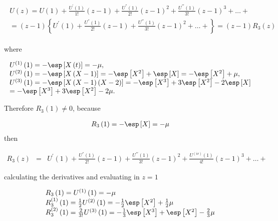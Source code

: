 \begin{eqnarray*}
\begin{array}{l}
U\left(z\right)=U\left(1\right)+\frac{U^{'}\left(1\right)}{1!}\left(z-1\right)+\frac{U^{''}\left(1\right)}{2!}\left(z-1\right)^{2}+\frac{U^{'''}\left(1\right)}{3!}\left(z-1\right)^{3}+\ldots+\\
=\left(z-1\right)\left\{U^{'}\left(1\right)+\frac{U^{''}\left(1\right)}{2!}\left(z-1\right)+\frac{U^{'''}\left(1\right)}{3!}\left(z-1\right)^{2}+\ldots+\right\}
=\left(z-1\right)R_{3}\left(z\right)
\end{array}
\end{eqnarray*}

where

\begin{eqnarray*}
\begin{array}{l}
U^{(1)}\left(1\right)=-\esp\left[X\left(t\right)\right]=-\mu,\\ U^{(2)}\left(1\right)=-\esp\left[X\left(X-1\right)\right]
=-\esp\left[X^{2}\right]+\esp\left[X\right]=-\esp\left[X^{2}\right]+\mu,\\
U^{(3)}\left(1\right)=-\esp\left[X\left(X-1\right)\left(X-2\right)\right]
=-\esp\left[X^{3}\right]+3\esp\left[X^{2}\right]-2\esp\left[X\right]\\
=-\esp\left[X^{3}\right]+3\esp\left[X^{2}\right]-2\mu.
\end{array}
\end{eqnarray*}

Therefore $R_{3}\left(1\right)\neq0$, because

\begin{eqnarray}\label{Eq.R3}
R_{3}\left(1\right)=-\esp\left[X\right]=-\mu
\end{eqnarray}
then

\begin{eqnarray}
R_{3}\left(z\right)&=&U^{'}\left(1\right)+\frac{U^{''}\left(1\right)}{2!}\left(z-1\right)+\frac{U^{'''}\left(1\right)}{3!}\left(z-1\right)^{2}+\frac{U^{(iv)}\left(1\right)}{4!}\left(z-1\right)^{3}+\ldots+
\end{eqnarray}

calculating the derivatives and evaluating in $z=1$

\begin{eqnarray}
\begin{array}{l}
R_{3}\left(1\right)=U^{(1)}\left(1\right)=-\mu\\
R_{3}^{(1)}\left(1\right)=\frac{1}{2}U^{(2)}\left(1\right)=-\frac{1}{2}\esp\left[X^{2}\right]+\frac{1}{2}\mu\\
R_{3}^{(2)}\left(1\right)=\frac{2}{3!}U^{(3)}\left(1\right)
=-\frac{1}{3}\esp\left[X^{3}\right]+\esp\left[X^{2}\right]-\frac{2}{3}\mu
\end{array}
\end{eqnarray}

